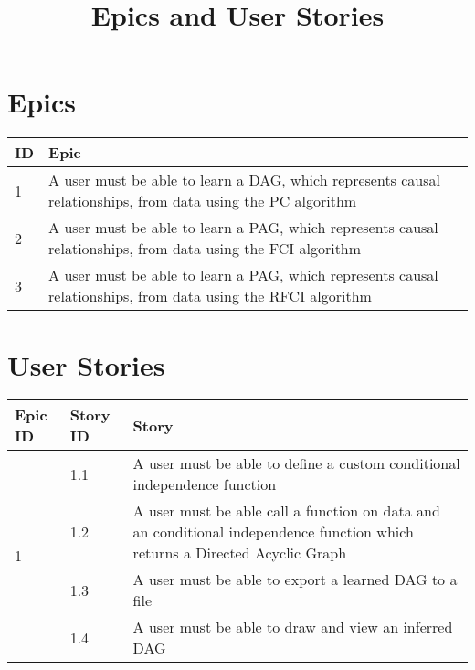 \documentclass{article}
\begin{document}
\title{Epics and User Stories}
\maketitle
\section{Epics}
\begin{tabular}{| l | p{12cm} |}
	\hline	
	ID & Epic \\
	\hline
	1 & A user must be able to learn a DAG, which represents causal relationships, from data using the PC algorithm \\
	\hline
	2 & A user must be able to learn a PAG, which represents causal relationships, from data using the FCI algorithm \\
	\hline
	3 & A user must be able to learn a PAG, which represents causal relationships, from data using the RFCI algorithm \\
	\hline
\end{tabular}

\section{User Stories}

\begin{tabular}{| l | l | p{9.5cm} |}
	\hline
	Epic ID & Story ID & Story \\
	\hline
	\multirow{4}{*}{1} & 1.1 & A user must be able to define a custom conditional independence  function\\
	\cline{2-3}
	& 1.2 & A user  must be able call a function on data and an conditional independence function which returns a Directed Acyclic Graph \\
	\cline{2-3}
	& 1.3 & A user must be able to export a learned DAG to a file \\
	\cline{2-3}
	& 1.4 & A user must be able to draw and view an inferred DAG \\
	\hline
	 
\end{tabular}
\end{document}
